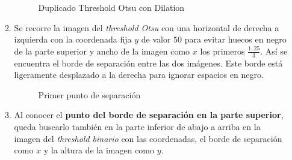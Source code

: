 \begin{enumerate}
\begin{enumerate}[label*=\arabic*.]
    \begin{figure}[H]
      \caption{Duplicado Threshold Otsu con Dilation}
      \centering \setlength\fboxsep{0pt} \setlength\fboxrule{0.5pt}
    \end{figure}

  \item Se recorre la imagen del \emph{threshold Otsu} con una
    horizontal de derecha a izquierda con la coordenada fija $y$ de
    valor $50$ para evitar huecos en negro de la parte superior y
    ancho de la imagen como $x$ los primeros $\frac{1,25}{3}$. Así se
    encuentra el borde de separación entre las dos imágenes.  Este
    borde está ligeramente desplazado a la derecha para ignorar
    espacios en negro.

    \begin{figure}[H]
      \caption{Primer punto de separación}
      \centering \setlength\fboxsep{0pt} \setlength\fboxrule{0.5pt}
    \end{figure}

  \item Al conocer el \textbf{punto del borde de separación en la
      parte superior}, queda buscarlo también en la parte inferior de
    abajo a arriba en la imagen del \emph{threshold binario} con las
    coordenadas, el borde de separación como $x$ y la altura de la
    imagen como $y$.


\end{enumerate}
\end{enumerate}
